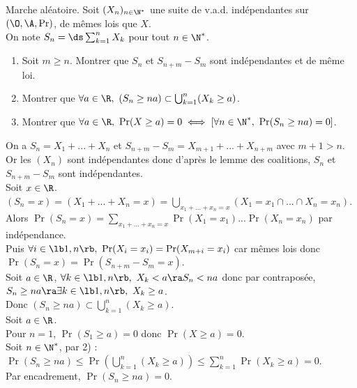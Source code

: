 \documentclass[11pt]{article}
\begin{document}
\vspace*{-0.9cm}

\begin{exercice}{Marche aléatoire.}{}
    Soit $(X_n)_{n\in\N^*}$ une suite de v.a.d. indépendantes sur $(\O,\A,\Pr)$, de mêmes lois que $X$.\\
    On note $S_n = \ds\sum_{k=1}^n X_k$ pour tout $n\in\N^*$.
    \begin{enumerate}
        \item Soit $m\geq n$. Montrer que $S_n$ et $S_{n+m}-S_m$ sont indépendantes et de même loi.
        \item Montrer que $\forall a \in \R, ~ (S_n \geq na) \subset \bigcup_{k=1}^n (X_k\geq a)$.
        \item Montrer que $\forall a \in \R, ~ \Pr(X\geq a) = 0 \iff \left[ \forall n \in \N^*, ~ \Pr(S_n \geq na) = 0 \right]$.
    \end{enumerate}
    \tcblower
     On a $S_n = X_1 + ... + X_n$ et $S_{n+m} - S_m = X_{m+1} + ... + X_{n+m}$ avec $m+1>n$.\\
    Or les $(X_n)$ sont indépendantes donc d'après le lemme des coalitions, $S_n$ et $S_{n+m}-S_m$ sont indépendantes.\\
    Soit $x\in\R$. $(S_n = x) = (X_1 + ... + X_n = x) = \bigcup_{x_1+...+x_n=x}(X_1=x_1\cap...\cap X_n=x_n)$.\\
    Alors $\Pr(S_n=x)=\sum_{x_1+...+x_n=x}\Pr(X_1=x_1)...\Pr(X_n=x_n)$ par indépendance.\\
    Puis $\forall i \in \lb1,n\rb, ~ \Pr(X_i=x_i)=\Pr(X_{m+i}=x_i)$ car mêmes lois donc $\Pr(S_n=x)=\Pr(S_{n+m}-S_m=x)$.\\
     Soit $a\in\R$, $\forall k \in \lb1,n\rb, ~ X_k < a \ra S_n < na$ donc par contraposée, $S_n\geq na \ra \exists k \in \lb1,n\rb, ~ X_k \geq a$.\\
    Donc $(S_n\geq na) \subset \bigcup_{k=1}^n (X_k \geq a)$.\\
     Soit $a\in\R$.\\
    \boxed{\la} Pour $n=1$, $\Pr(S_1 \geq a) = 0$ donc $\Pr(X\geq a)=0$.\\
    \boxed{\ra} Soit $n\in\N^*$, par 2) : $\Pr(S_n\geq na) \leq \Pr(\bigcup_{k=1}^n(X_k\geq a)) \leq \sum_{k=1}^n\Pr(X_k \geq a)=0$.\\
    Par encadrement, $\Pr(S_n \geq na) = 0$.
\end{exercice}
\end{document}
